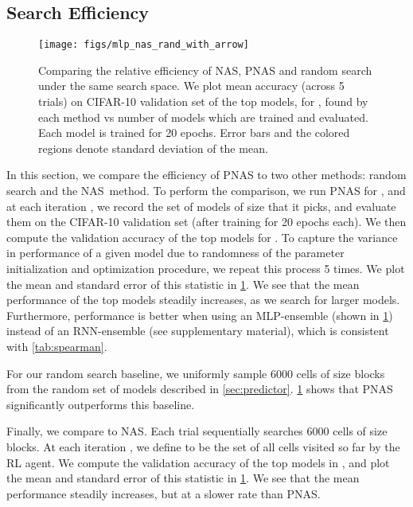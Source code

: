 \documentclass[runningheads]{llncs}
\newcommand{\NAS}{NAS}
\newcommand{\NASRL}{\NAS}
\newcommand{\NAScell}{\NAS}
\begin{document}
 
\subsection{Search Efficiency}
\label{sec:efficiency}


\begin{figure}[t]
    \centering
    \texttt{[image: figs/mlp\_nas\_rand\_with\_arrow]}
\caption{
    Comparing the relative efficiency of NAS,  PNAS and random search under the same search space.
    We plot mean accuracy (across 5 trials) on CIFAR-10 validation set of the top
     models, for , found by each method
    vs number of models which are trained and evaluated.
    Each model is trained for 20 epochs.
    Error bars and the colored regions denote standard deviation of the mean.
    }
    \label{fig:efficiency}
\end{figure}


In this section, we compare the efficiency of PNAS to two other methods:
random search and the \NAScell\ method.
To perform the comparison,
we run PNAS for ,
and at each iteration , we record the set   of  models of size 
that it picks,
and evaluate them on the CIFAR-10 validation set (after training for 20 epochs each).
We then compute the validation accuracy of the top  models
for .
To capture the variance in performance of a given model due to randomness of
the parameter initialization and optimization procedure, we repeat this process 5 times.
We plot the mean and standard error of this statistic in \cref{fig:efficiency}.
We see that the mean performance of the top  models steadily increases, as we search
for larger models.
Furthermore, performance is better when using an MLP-ensemble (shown in \cref{fig:efficiency})
instead of an RNN-ensemble (see supplementary material),
which is consistent with
\cref{tab:spearman}.

For our random search baseline, we uniformly sample 6000 cells of size  blocks from
the random set of models 
described in \cref{sec:predictor}.
 \cref{fig:efficiency} shows that PNAS significantly outperforms this baseline.

Finally, we compare to \NASRL.
Each trial sequentially searches 6000 cells of size  blocks.
At each iteration , we define  to be the set of all cells visited so far
by the RL agent. We compute the 
validation accuracy of the top   models in , and
plot the mean and standard error of this statistic in \cref{fig:efficiency}.
We see that the mean performance  steadily increases, but at a slower rate than PNAS.
\end{document}

